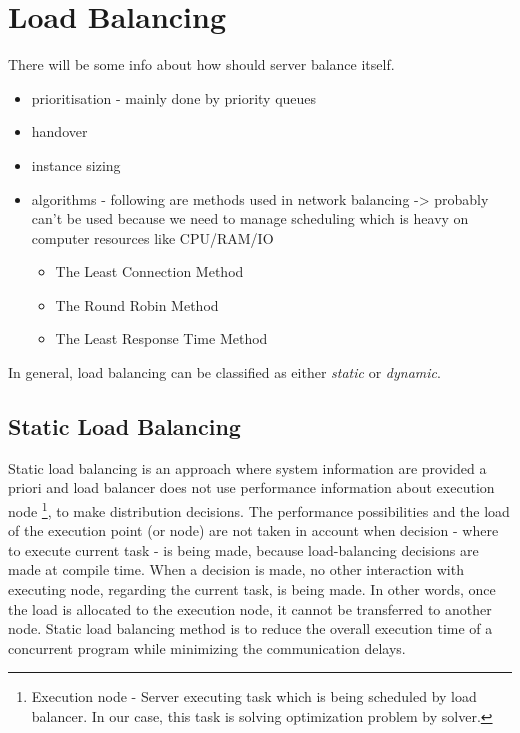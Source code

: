 
\section{Load Balancing}\label{sec:load-balancing}
There will be some info about how should server balance itself.
\begin{itemize}
    \item prioritisation - mainly done by priority queues
    \item handover
    \item instance sizing
    \item algorithms - following are methods used in network balancing -> probably can't be used because we need to manage scheduling
    which is heavy on computer resources like CPU/RAM/IO
    \begin{itemize}
        \item The Least Connection Method
        \item The Round Robin Method
        \item The Least Response Time Method
    \end{itemize}
\end{itemize}

In general, load balancing can be classified as either \textit{static} or \textit{dynamic}.

\subsection{Static Load Balancing}\label{subsec:static-load-balancing}
Static load balancing is an approach where system information are provided a priori
and load balancer does not use performance information about execution node
\footnote{Execution node - Server executing task which is being scheduled by load balancer.
In our case, this task is solving optimization problem by solver.},
to make distribution decisions.
The performance possibilities and the load of the execution point (or node) are not taken in account
when decision - where to execute current task - is being made, because load-balancing decisions are made at compile time.
When a decision is made, no other interaction with executing node, regarding the current task, is being made.
In other words, once the load is allocated to the execution node, it cannot be transferred to another node.
Static load balancing method is to reduce the overall execution time of a concurrent program while minimizing the communication delays.\cite{web:loadBalancingInGridComputing}\\

